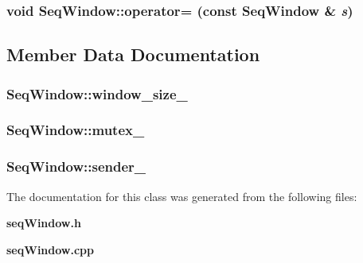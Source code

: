 \subsubsection{\setlength{\rightskip}{0pt plus 5cm}void Seq\-Window::operator= (const {\bf Seq\-Window} \& {\em s})\hspace{0.3cm}{\tt  [private]}}\label{classSeqWindow_37887e66297163fe301c77f2977a2a2b}




\subsection{Member Data Documentation}
\subsubsection{ {\bf Seq\-Window::window\_\-size\_\-}\hspace{0.3cm}{\tt  [private]}}\label{classSeqWindow_ef85ba28f8a655dc8c8d34aeddb8eea0}


\subsubsection{ {\bf Seq\-Window::mutex\_\-}\hspace{0.3cm}{\tt  [private]}}\label{classSeqWindow_87ec44a9a7398ecbcb92d90ba95b37a0}


\subsubsection{ {\bf Seq\-Window::sender\_\-}\hspace{0.3cm}{\tt  [private]}}\label{classSeqWindow_8bfc3742cacc75e9a72de13ff6ad98a2}




The documentation for this class was generated from the following files:\begin{CompactItemize}
\item 
{\bf seq\-Window.h}\item 
{\bf seq\-Window.cpp}\end{CompactItemize}
